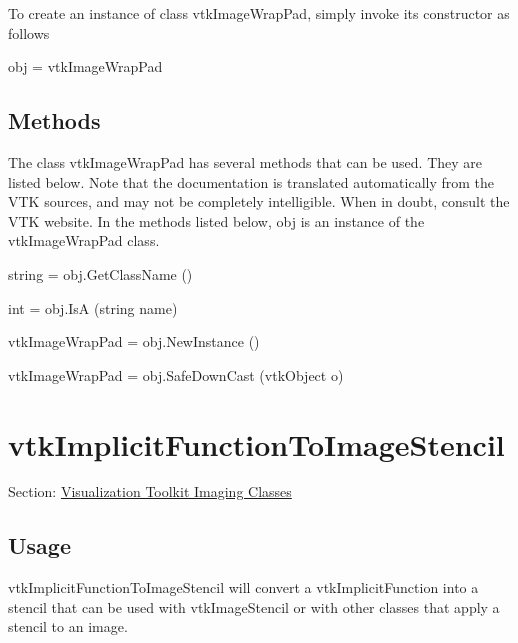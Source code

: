 To create an instance of class vtk\-Image\-Wrap\-Pad, simply invoke its constructor as follows \begin{DoxyVerb}  obj = vtkImageWrapPad
\end{DoxyVerb}
 \hypertarget{vtkwidgets_vtkxyplotwidget_Methods}{}\subsection{Methods}\label{vtkwidgets_vtkxyplotwidget_Methods}
The class vtk\-Image\-Wrap\-Pad has several methods that can be used. They are listed below. Note that the documentation is translated automatically from the V\-T\-K sources, and may not be completely intelligible. When in doubt, consult the V\-T\-K website. In the methods listed below, {\ttfamily obj} is an instance of the vtk\-Image\-Wrap\-Pad class. 
\begin{DoxyItemize}
\item {\ttfamily string = obj.\-Get\-Class\-Name ()}  
\item {\ttfamily int = obj.\-Is\-A (string name)}  
\item {\ttfamily vtk\-Image\-Wrap\-Pad = obj.\-New\-Instance ()}  
\item {\ttfamily vtk\-Image\-Wrap\-Pad = obj.\-Safe\-Down\-Cast (vtk\-Object o)}  
\end{DoxyItemize}\hypertarget{vtkimaging_vtkimplicitfunctiontoimagestencil}{}\section{vtk\-Implicit\-Function\-To\-Image\-Stencil}\label{vtkimaging_vtkimplicitfunctiontoimagestencil}
Section\-: \hyperlink{sec_vtkimaging}{Visualization Toolkit Imaging Classes} \hypertarget{vtkwidgets_vtkxyplotwidget_Usage}{}\subsection{Usage}\label{vtkwidgets_vtkxyplotwidget_Usage}
vtk\-Implicit\-Function\-To\-Image\-Stencil will convert a vtk\-Implicit\-Function into a stencil that can be used with vtk\-Image\-Stencil or with other classes that apply a stencil to an image.

